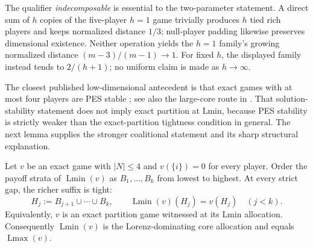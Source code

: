 The qualifier \emph{indecomposable} is essential to the two-parameter
statement.  A direct sum of $h$ copies of the five-player $h=1$ game trivially
produces $h$ tied rich players and keeps normalized distance $1/3$;
null-player padding likewise preserves dimensional existence.  Neither
operation yields the $h=1$ family's growing normalized distance
$(m-3)/(m-1)\to1$.  For fixed $h$, the displayed family instead tends to
$2/(h+1)$; no uniform claim is made as $h\to\infty$.

The closest published low-dimensional antecedent is that exact games with at
most four players are PES stable \citep{Dietzenbacher2021}; see also the
large-core route in \citet{Biswas1999}.  That solution-stability statement
does not imply exact partition at Lmin, because PES stability is strictly
weaker than the exact-partition tightness condition in general.  The next
lemma supplies the stronger coalitional statement and its sharp structural
explanation.

\begin{lemma}
\label{lem:lx-richer-suffix}
Let $v$ be an exact game with $|N|\leq4$ and $v(\{i\})=0$ for every player.
Order the payoff strata of $\operatorname{Lmin}(v)$ as
$B_1,\ldots,B_k$ from lowest to highest.  At every strict gap, the richer
suffix is tight:
\[
 H_j:=B_{j+1}\cup\cdots\cup B_k,
 \qquad
 \operatorname{Lmin}(v)(H_j)=v(H_j)
 \quad (j<k).
 \tag{RST}\label{eq:lx-richer-suffix}
\]
Equivalently, $v$ is an exact partition game witnessed at its Lmin allocation.
Consequently $\operatorname{Lmin}(v)$ is the Lorenz-dominating core allocation
and equals $\operatorname{Lmax}(v)$.
\end{lemma}

